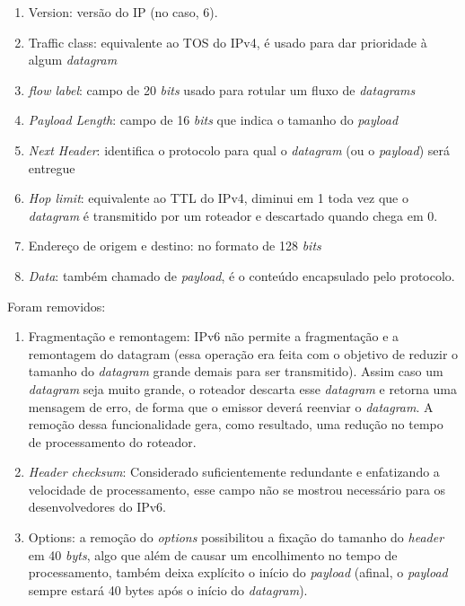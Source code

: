 \begin{enumerate}
\def\labelenumi{\arabic{enumi}.}
\tightlist
\item
  Version: versão do IP (no caso, 6).
\item
  Traffic class: equivalente ao TOS do IPv4, é usado para dar prioridade
  à algum \emph{datagram}
\item
  \emph{flow label}: campo de 20 \emph{bits} usado para rotular um fluxo
  de \emph{datagrams}
\item
  \emph{Payload Length}: campo de 16 \emph{bits} que indica o tamanho do
  \emph{payload}
\item
  \emph{Next Header}: identifica o protocolo para qual o \emph{datagram}
  (ou o \emph{payload}) será entregue
\item
  \emph{Hop limit}: equivalente ao TTL do IPv4, diminui em 1 toda vez
  que o \emph{datagram} é transmitido por um roteador e descartado
  quando chega em 0.
\item
  Endereço de origem e destino: no formato de 128 \emph{bits}
\item
  \emph{Data}: também chamado de \emph{payload}, é o conteúdo
  encapsulado pelo protocolo.
\end{enumerate}

Foram removidos:

\begin{enumerate}
\def\labelenumi{\arabic{enumi}.}
\tightlist
\item
  Fragmentação e remontagem: IPv6 não permite a fragmentação e a
  remontagem do datagram (essa operação era feita com o objetivo de
  reduzir o tamanho do \emph{datagram} grande demais para ser
  transmitido). Assim caso um \emph{datagram} seja muito grande, o
  roteador descarta esse \emph{datagram} e retorna uma mensagem de erro,
  de forma que o emissor deverá reenviar o \emph{datagram}. A remoção
  dessa funcionalidade gera, como resultado, uma redução no tempo de
  processamento do roteador.
\item
  \emph{Header checksum}: Considerado suficientemente redundante e
  enfatizando a velocidade de processamento, esse campo não se mostrou
  necessário para os desenvolvedores do IPv6.
\item
  Options: a remoção do \emph{options} possibilitou a fixação do tamanho
  do \emph{header} em 40 \emph{byts}, algo que além de causar um
  encolhimento no tempo de processamento, também deixa explícito o
  início do \emph{payload} (afinal, o \emph{payload} sempre estará 40
  bytes após o início do \emph{datagram}).
\end{enumerate}

